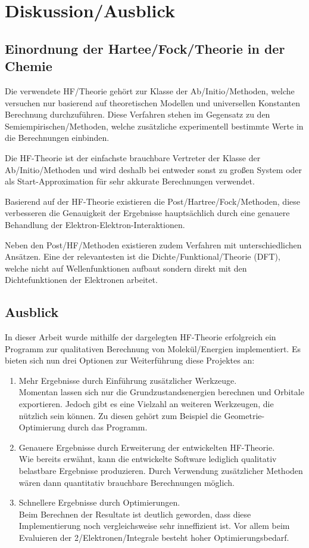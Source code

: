 \chapter{Diskussion/Ausblick}

\section{Einordnung der Hartee\-/Fock\-/Theorie in der Chemie}
Die verwendete HF\-/Theorie gehört zur Klasse der Ab\-/Initio\-/Methoden,
welche versuchen nur basierend auf theoretischen Modellen und
universellen Konstanten Berechnung durchzuführen.
Diese Verfahren stehen im Gegensatz zu den Semiempirischen\-/Methoden,
welche zusätzliche experimentell bestimmte Werte in die Berechnungen einbinden.

Die HF-Theorie ist der einfachste brauchbare Vertreter
der Klasse der Ab\-/Initio\-/Methoden
und wird deshalb bei entweder sonst zu großen System oder
als Start-Approximation für sehr akkurate Berechnungen verwendet.
\cite[S. 433]{structure_2013}

Basierend auf der HF-Theorie existieren die Post\-/Hartree\-/Fock\-/Methoden,
diese verbesseren die Genauigkeit der Ergebnisse hauptsächlich
durch eine genauere Behandlung der Elektron-Elektron-Interaktionen.

Neben den Post\-/HF\-/Methoden existieren zudem Verfahren
mit unterschiedlichen Ansätzen. Eine der relevantesten ist
die Dichte\-/Funktional\-/Theorie (DFT), welche nicht auf
Wellenfunktionen aufbaut sondern direkt mit den
Dichtefunktionen der Elektronen arbeitet.

\section{Ausblick}
In dieser Arbeit wurde mithilfe der dargelegten HF-Theorie
erfolgreich ein Programm zur qualitativen Berechnung von Molekül\-/Energien
implementiert. Es bieten sich nun drei Optionen zur Weiterführung diese Projektes an:
\begin{enumerate}
    \item Mehr Ergebnisse durch Einführung zusätzlicher Werkzeuge.\\
    Momentan lassen sich nur die Grundzustandsenergien berechnen und Orbitale exportieren.
    Jedoch gibt es eine Vielzahl an weiteren Werkzeugen, die nützlich sein können.
    Zu diesen gehört zum Beispiel die Geometrie-Optimierung durch das Programm. 
    \item Genauere Ergebnisse durch Erweiterung der entwickelten HF-Theorie.\\
    Wie bereits erwähnt, kann die entwickelte Software 
    lediglich qualitativ belastbare Ergebnisse produzieren.
    Durch Verwendung zusätzlicher Methoden wären dann
    quantitativ brauchbare Berechnungen möglich.
    \item Schnellere Ergebnisse durch Optimierungen.\\
    Beim Berechnen der Resultate ist deutlich geworden,
    dass diese Implementierung noch vergleichsweise sehr inneffizient ist.
    Vor allem beim Evaluieren der 2\-/Elektronen\-/Integrale besteht hoher Optimierungsbedarf.
\end{enumerate}